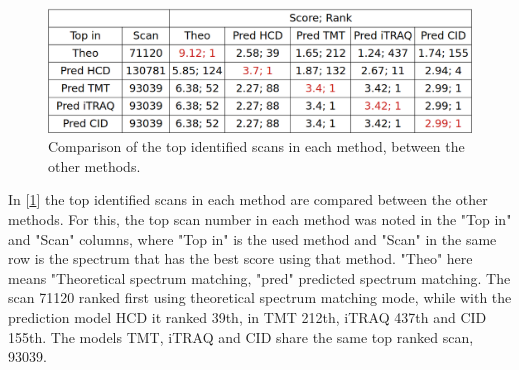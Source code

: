 \documentclass[11pt]{article}
\begin{document}
\begin{figure}[ht]
\centering
\includegraphics[width=1\textwidth]{figs/ident-comparison.png}
\caption{Comparison of the top identified scans in each method, between the other methods.}
\label{fig:ident-comparison}
\end{figure}

In [\cref{fig:ident-comparison}] the top identified scans in each method are compared between the other methods. For this, the top scan number in each method was noted in the "Top in" and "Scan" columns, where "Top in" is the used method and "Scan" in the same row is the spectrum that has the best score using that method. "Theo" here means "Theoretical spectrum matching, "pred" predicted spectrum matching. 
The scan 71120 ranked first using theoretical spectrum matching mode, while with the prediction model HCD it ranked 39th, in TMT 212th, iTRAQ 437th and CID 155th. The models TMT, iTRAQ and CID share the same top ranked scan, 93039.
\end{document}
